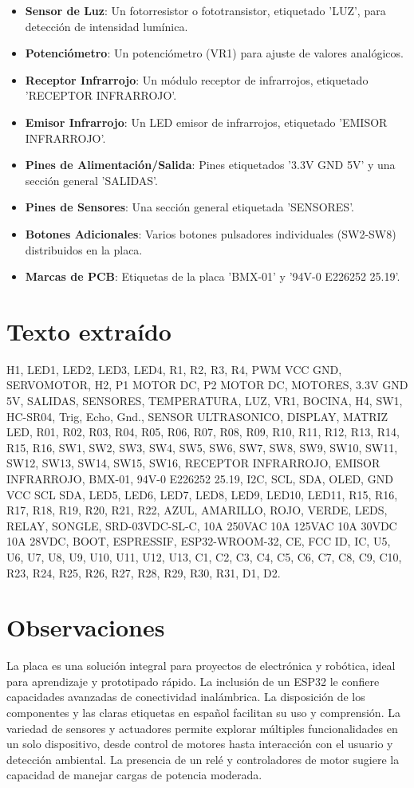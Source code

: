 \documentclass[11pt,a4paper]{article}
\begin{document}
\begin{itemize}[leftmargin=1.5em, itemsep=2pt]
  \item \textbf{Sensor de Luz}: Un fotorresistor o fototransistor, etiquetado 'LUZ', para detección de intensidad lumínica.
  \item \textbf{Potenciómetro}: Un potenciómetro (VR1) para ajuste de valores analógicos.
  \item \textbf{Receptor Infrarrojo}: Un módulo receptor de infrarrojos, etiquetado 'RECEPTOR INFRARROJO'.
  \item \textbf{Emisor Infrarrojo}: Un LED emisor de infrarrojos, etiquetado 'EMISOR INFRARROJO'.
  \item \textbf{Pines de Alimentación/Salida}: Pines etiquetados '3.3V GND 5V' y una sección general 'SALIDAS'.
  \item \textbf{Pines de Sensores}: Una sección general etiquetada 'SENSORES'.
  \item \textbf{Botones Adicionales}: Varios botones pulsadores individuales (SW2-SW8) distribuidos en la placa.
  \item \textbf{Marcas de PCB}: Etiquetas de la placa 'BMX-01' y '94V-0 E226252 25.19'.
\end{itemize}

\section*{Texto extraído}
H1, LED1, LED2, LED3, LED4, R1, R2, R3, R4, PWM VCC GND, SERVOMOTOR, H2, P1 MOTOR DC, P2 MOTOR DC, MOTORES, 3.3V GND 5V, SALIDAS, SENSORES, TEMPERATURA, LUZ, VR1, BOCINA, H4, SW1, HC-SR04, Trig, Echo, Gnd., SENSOR ULTRASONICO, DISPLAY, MATRIZ LED, R01, R02, R03, R04, R05, R06, R07, R08, R09, R10, R11, R12, R13, R14, R15, R16, SW1, SW2, SW3, SW4, SW5, SW6, SW7, SW8, SW9, SW10, SW11, SW12, SW13, SW14, SW15, SW16, RECEPTOR INFRARROJO, EMISOR INFRARROJO, BMX-01, 94V-0 E226252 25.19, I2C, SCL, SDA, OLED, GND VCC SCL SDA, LED5, LED6, LED7, LED8, LED9, LED10, LED11, R15, R16, R17, R18, R19, R20, R21, R22, AZUL, AMARILLO, ROJO, VERDE, LEDS, RELAY, SONGLE, SRD-03VDC-SL-C, 10A 250VAC 10A 125VAC 10A 30VDC 10A 28VDC, BOOT, ESPRESSIF, ESP32-WROOM-32, CE, FCC ID, IC, U5, U6, U7, U8, U9, U10, U11, U12, U13, C1, C2, C3, C4, C5, C6, C7, C8, C9, C10, R23, R24, R25, R26, R27, R28, R29, R30, R31, D1, D2.

\section*{Observaciones}
La placa es una solución integral para proyectos de electrónica y robótica, ideal para aprendizaje y prototipado rápido. La inclusión de un ESP32 le confiere capacidades avanzadas de conectividad inalámbrica. La disposición de los componentes y las claras etiquetas en español facilitan su uso y comprensión. La variedad de sensores y actuadores permite explorar múltiples funcionalidades en un solo dispositivo, desde control de motores hasta interacción con el usuario y detección ambiental. La presencia de un relé y controladores de motor sugiere la capacidad de manejar cargas de potencia moderada.
\end{document}
